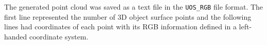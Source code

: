 The generated point cloud was saved as a text file in the \texttt{UOS\_RGB} file format. The first line represented the number of 3D object surface points and the following lines had coordinates of each point with its RGB information defined in a left-handed coordinate system. 